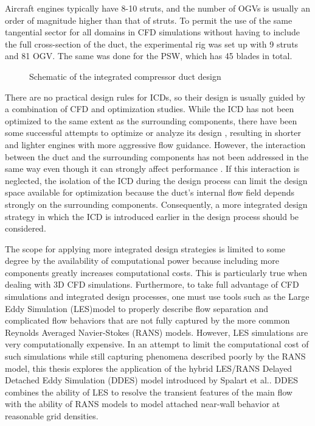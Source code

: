 Aircraft engines typically have 8-10 struts, and the number of OGVs is usually an order of magnitude higher than that of struts. To permit the use of the same tangential sector for all domains in CFD simulations without having to include the full cross-section of the duct, the experimental rig was set up with 9 struts and 81 OGV. The same was done for the PSW, which has 45 blades in total.



 \begin{figure}[h!]
   \centering

  \caption{Schematic of the integrated compressor duct design}
  \label{fig:schema}
\end{figure}

There are no practical design rules for ICDs, so their design is usually guided by a combination of CFD and optimization studies. While the ICD has not been optimized to the same extent as the surrounding components, there have been some successful attempts to optimize or analyze its design \cite{CompressorOpt,OptComp1,OptComp2,Walker2011}, resulting in shorter and lighter engines with more aggressive flow guidance. However, the interaction between the duct and the surrounding components has not been addressed in the same way even though it can strongly affect performance \cite{IntegrP2}. If this interaction is neglected, the isolation of the ICD during the design process can limit the design space available for optimization because the duct's internal flow field depends strongly on the surrounding components. Consequently, a more integrated design strategy in which the ICD is introduced earlier in the design process should be considered.

The scope for applying more integrated design strategies is limited to some degree by the availability of computational power because including more components greatly increases computational costs. This is particularly true when dealing with 3D CFD simulations. Furthermore, to take full advantage of CFD simulations and integrated design processes, one must use tools such as the Large Eddy Simulation (LES)model to properly describe flow separation and complicated flow behaviors that are not fully captured by the more common Reynolds Averaged Navier-Stokes (RANS) models. However, LES simulations are very computationally expensive. In an attempt to limit the computational cost of such simulations while still capturing phenomena described poorly by the RANS model, this thesis explores the application of the hybrid LES/RANS Delayed Detached Eddy Simulation (DDES) model introduced by Spalart et al.\cite{DDES}. DDES combines the ability of LES to resolve the transient features of the main flow with the ability of RANS models to model attached near-wall behavior at reasonable grid densities. 

